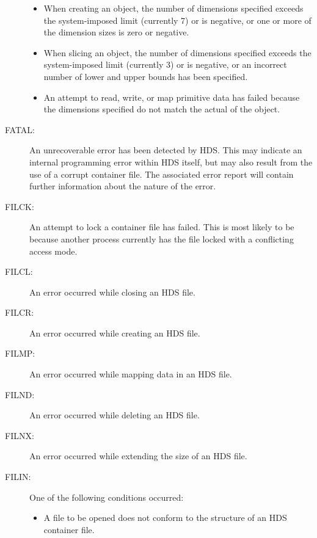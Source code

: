 \documentclass[twoside,11pt]{starlink}
\begin{document}
\begin{description}
\begin{itemize}
\item When creating an object, the number of dimensions specified exceeds the
system-imposed limit (currently 7) or is negative, or one or more of the
dimension sizes is zero or negative.

\item When slicing an object, the number of dimensions specified exceeds the
system-imposed limit (currently 3) or is negative, or an incorrect number of
lower and upper bounds has been specified.

\item An attempt to read, write, or map primitive data has failed because the
dimensions specified do not match the actual  of the object.

\end{itemize}

\item [FATAL:]
An unrecoverable error has been detected by HDS. This may indicate an internal
programming error within HDS itself, but may also result from the use of a
corrupt container file. The associated error report will contain further
information about the nature of the error.

\item [FILCK:]
An attempt to lock a container file has failed. This is most likely to be
because another process currently has the file locked with a conflicting access
mode.

\item [FILCL:]
An error occurred while closing an HDS file.

\item [FILCR:]
An error occurred while creating an HDS file.

\item [FILMP:]
An error occurred while mapping data in an HDS file.

\item [FILND:]
An error occurred while deleting an HDS file.

\item [FILNX:]
An error occurred while extending the size of an HDS file.

\item [FILIN:]
One of the following conditions occurred:
\begin{itemize}

\item A file to be opened does not conform to the structure of an HDS container
file.


\end{itemize}
\end{description}
\end{document}
